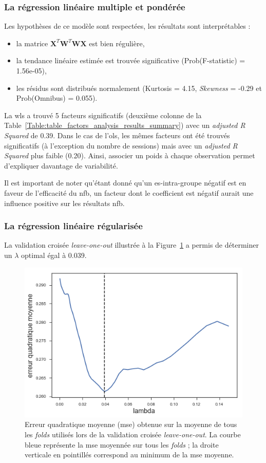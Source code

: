 \subsubsection{La régression linéaire multiple et pondérée}

Les hypothèses de ce modèle sont respectées, les résultats sont interprétables :
\begin{itemize}
	\item la matrice ${\textbf{X}}^{T}\textbf{W}^{T}\textbf{WX}$ est bien régulière,
  \item la tendance linéaire estimée est trouvée significative (Prob(F-statistic) = 1.56e-05),
  \item les résidus sont distribués normalement (Kurtosis = 4.15, \textit{Skewness} = -0.29 et Prob(Omnibus) = 0.055).
\end{itemize}

La \gls{wls} a trouvé 5 facteurs significatifs (deuxième colonne de la Table~\ref{Table:table_factors_analysis_results_summary}) avec un \textit{adjusted R Squared} de 0.39. 
Dans le cas de l'\gls{ols}, les mêmes facteurs ont été trouvés significatifs (à l'exception du nombre de sessions) mais avec un \textit{adjusted R Squared} plus faible (0.20). Ainsi, associer un poids
à chaque observation permet d'expliquer davantage de variabilité. 

Il est important de noter qu'étant donné qu'un \gls{es}-intra-groupe négatif est en faveur de l'efficacité du \gls{nfb},
un facteur dont le coefficient est négatif aurait une influence positive sur les résultats \gls{nfb}.


\subsubsection{La régression linéaire régularisée}

La validation croisée \textit{leave-one-out} illustrée à la Figure~\ref{Figure:selection_lambda_lasso} a permis de déterminer un $\lambda$ optimal égal à 0.039.
\begin{figure}[h!]
  \centering
	\includegraphics[width=0.5\linewidth]{figures/chapter-3/factors-selection-lasso-best-lambda} 
  \caption{Erreur quadratique moyenne (\gls{mse}) obtenue sur la moyenne de tous les \textit{folds} utilisés lors de la validation 
	croisée \textit{leave-one-out}. La courbe bleue représente la \gls{mse} moyennée sur tous les \textit{folds} ; la droite verticale en pointillés correspond
	au minimum de la \gls{mse} moyenne.}
  \label{Figure:selection_lambda_lasso}
\end{figure}

